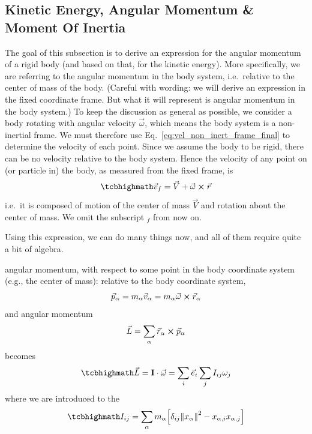\documentclass[../class_mech_main.tex]{subfiles}
\begin{document}
		\subsection{Kinetic Energy, Angular Momentum \& Moment Of Inertia}
The goal of this subsection is to derive an expression for the angular momentum of a rigid body (and based on that, for the kinetic energy). More specifically, we are referring to the angular momentum in the body system, i.e.~relative to the center of mass of the body. (Careful with wording: we will derive an expression in the fixed coordinate frame. But what it will represent is angular momentum in the body system.) To keep the discussion as general as possible, we consider a body rotating with angular velocity $\vec{\omega}$, which means the body system is a non-inertial frame. We must therefore use Eq.~\eqref{eq:vel_non_inert_frame_final} to determine the velocity of each point. Since we assume the body to be rigid, there can be no velocity relative to the body system. Hence the velocity of any point on (or particle in) the body, as measured from the fixed frame, is
\begin{equation}
	\eqbox{
		\vec{v}_f = \vec{V} + \vec{\omega} \cross \vec{r}
	}
\end{equation}
i.e.~it is composed of motion of the center of mass $\vec{V}$ and rotation about the center of mass. We omit the subscript ${}_f$ from now on.


Using this expression, we can do many things now, and all of them require quite a bit of algebra.


angular momentum, with respect to some point in the body coordinate system (e.g., the center of mass): relative to the body coordinate system,
\begin{equation}
	\vec{p}_\alpha = m_\alpha \vec{v}_\alpha = m_\alpha \vec{\omega} \cross \vec{r}_\alpha
\end{equation}
and angular momentum
\begin{equation*}
	\vec{L} = \sum_\alpha \vec{r}_\alpha \cross \vec{p}_\alpha
\end{equation*}
becomes
\begin{equation}
	\eqbox{
		\vec{L} = \tensor{I} \cdot \vec{\omega} = \sum_i \unitvec{i} \sum_j I_{ij} \omega_j
	}
\end{equation}
where we are introduced to the 
\begin{equation}
	\eqbox{
		I_{ij} = \sum_\alpha m_\alpha \qty[\delta_{ij} \norm{x_{\alpha}}^2 - x_{\alpha, i} x_{\alpha, j}]
	}
\end{equation}
\end{document}
